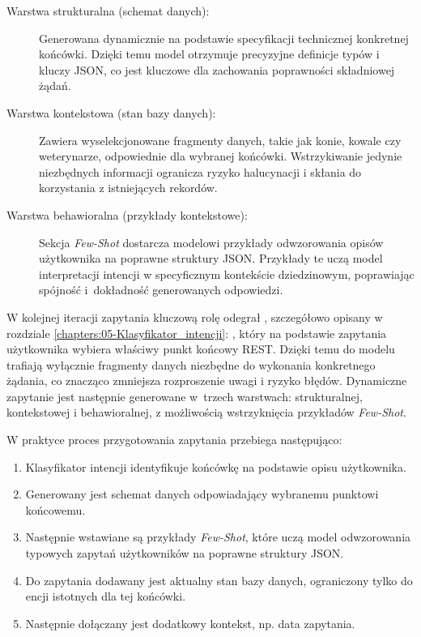 \begin{description}
	\item[Warstwa strukturalna (schemat danych):] Generowana dynamicznie na podstawie specyfikacji technicznej konkretnej końcówki. Dzięki temu model otrzymuje precyzyjne definicje typów i kluczy JSON, co jest kluczowe dla zachowania poprawności składniowej żądań.
	\item[Warstwa kontekstowa (stan bazy danych):] Zawiera wyselekcjonowane fragmenty danych, takie jak konie, kowale czy weterynarze, odpowiednie dla wybranej końcówki. Wstrzykiwanie jedynie niezbędnych informacji ogranicza ryzyko halucynacji i skłania do korzystania z istniejących rekordów.
	\item[Warstwa behawioralna (przykłady kontekstowe):] Sekcja \textit{Few-Shot} dostarcza modelowi przykłady odwzorowania opisów użytkownika na poprawne struktury JSON. Przykłady te uczą model interpretacji intencji w specyficznym kontekście dziedzinowym, poprawiając spójność i~dokładność generowanych odpowiedzi.
\end{description}


W kolejnej iteracji zapytania kluczową rolę odegrał , szczegółowo opisany w rozdziale \ref{chapters:05-Klasyfikator_intencji}: , który na podstawie zapytania użytkownika wybiera właściwy punkt końcowy REST. Dzięki temu do modelu trafiają wyłącznie fragmenty danych niezbędne do wykonania konkretnego żądania, co znacząco zmniejsza rozproszenie uwagi i ryzyko błędów. Dynamiczne zapytanie jest następnie generowane w~trzech warstwach: strukturalnej, kontekstowej i behawioralnej, z możliwością wstrzyknięcia przykładów \textit{Few-Shot}.


W praktyce proces przygotowania zapytania przebiega następująco:
\begin{enumerate}
\item Klasyfikator intencji identyfikuje końcówkę na podstawie opisu użytkownika.
\item Generowany jest schemat danych odpowiadający wybranemu punktowi końcowemu.
\item Następnie wstawiane są przykłady \textit{Few-Shot}, które uczą model odwzorowania typowych zapytań użytkowników na poprawne struktury JSON.
\item Do zapytania dodawany jest aktualny stan bazy danych, ograniczony tylko do encji istotnych dla tej końcówki.
\item Następnie dołączany jest dodatkowy kontekst, np. data zapytania.

\end{enumerate}


